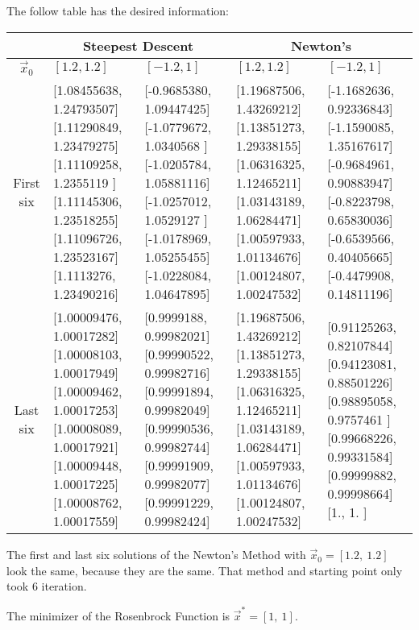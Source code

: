 \documentclass{article}
\newcommand{\sqbracks}[1]{\left[#1\right]}
\begin{document}
    \item The follow table has the desired information:
    \begin{table}[h!]
    \begin{tabular}{|c||p{3.74cm}|p{3.74cm}|p{3.74cm}|p{3.74cm}|}
    \hline
    & \multicolumn{2}{|c|}{Steepest Descent} & 
    \multicolumn{2}{|c|}{Newton's} \\
    \hline\hline
    $\vec{x}_0$ & $\sqbracks{1.2, 1.2}$ & $\sqbracks{-1.2, 1}$ & 
    $\sqbracks{1.2, 1.2}$ & $\sqbracks{-1.2, 1}$ \\
    \hline
    First six & 
    [1.08455638, 1.24793507]
    [1.11290849, 1.23479275]
    [1.11109258, 1.2355119 ]
    [1.11145306, 1.23518255]
    [1.11096726, 1.23523167]
    [1.1113276, 1.23490216] & 
    [-0.9685380, 1.09447425]
    [-1.0779672, 1.0340568 ]
    [-1.0205784, 1.05881116]
    [-1.0257012, 1.0529127 ]
    [-1.0178969, 1.05255455]
    [-1.0228084, 1.04647895]&
    [1.19687506, 1.43269212]
    [1.13851273, 1.29338155]
    [1.06316325, 1.12465211]
    [1.03143189, 1.06284471]
    [1.00597933, 1.01134676]
    [1.00124807, 1.00247532] &
    [-1.1682636, 0.92336843]
    [-1.1590085, 1.35167617]
    [-0.9684961, 0.90883947]
    [-0.8223798, 0.65830036]
    [-0.6539566, 0.40405665]
    [-0.4479908, 0.14811196] \\
    \hline
    Last six & 
    [1.00009476, 1.00017282]
    [1.00008103, 1.00017949]
    [1.00009462, 1.00017253]
    [1.00008089, 1.00017921]
    [1.00009448, 1.00017225]
    [1.00008762, 1.00017559]& 
    [0.9999188, 0.99982021]
    [0.99990522, 0.99982716]
    [0.99991894, 0.99982049]
    [0.99990536, 0.99982744]
    [0.99991909, 0.99982077]
    [0.99991229, 0.99982424]&
    [1.19687506, 1.43269212]
    [1.13851273, 1.29338155]
    [1.06316325, 1.12465211]
    [1.03143189, 1.06284471]
    [1.00597933, 1.01134676]
    [1.00124807, 1.00247532] & 
    [0.91125263, 0.82107844]
    [0.94123081, 0.88501226]
    [0.98895058, 0.9757461 ]
    [0.99668226, 0.99331584]
    [0.99999882, 0.99998664]
    [1.,         1.        ]\\
    \hline
    \end{tabular}
    \end{table}
    The first and last six solutions of the Newton's Method with 
    $\vec{x}_0 = \sqbracks{1.2,\ 1.2}$ look the same, because they 
    are the same. That method and starting point only took 6 
    iteration.
    
    \item The minimizer of the Rosenbrock Function is $\vec{x}^* 
    = \sqbracks{1,\ 1}$.
    
\end{document}
